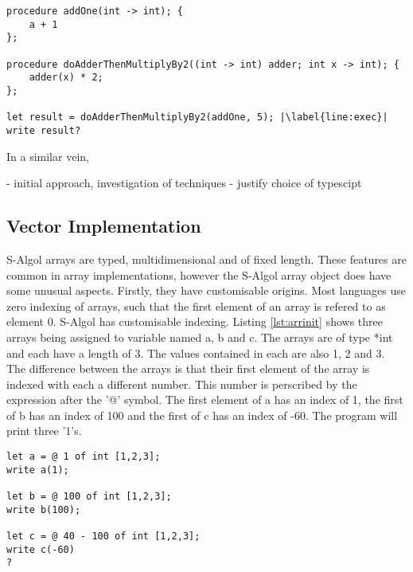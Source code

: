 \documentclass{article}
\begin{document}
\begin{lstlisting}[caption={},label={lst:untypedambiguity}, escapechar="|"]
procedure addOne(int -> int); {
	a + 1
};

procedure doAdderThenMultiplyBy2((int -> int) adder; int x -> int); {
	adder(x) * 2;
};

let result = doAdderThenMultiplyBy2(addOne, 5); |\label{line:exec}|
write result?
\end{lstlisting}

In a similar vein, 





- initial approach, investigation of techniques
- justify choice of typescipt
\subsection{Vector Implementation}

S-Algol arrays are typed, multidimensional and of fixed length. These features are common in array implementations, however the S-Algol array object does have some unusual aspects. Firstly, they have customisable origins. Most languages use zero indexing of arrays, such that the first element of an array is refered to as element 0. S-Algol has customisable indexing. Listing \ref{lst:arrinit} shows three arrays being assigned to variable named a, b and c. The arrays are of type *int and each have a length of 3. The values contained in each are also 1, 2 and 3. The difference between the arrays is that their first element of the array is indexed with each a different number. This number is perscribed by the expression after the '@' symbol. The first element of a has an index of 1, the first of b has an index of 100 and the first of c has an index of -60. The program will print three '1's.

\begin{lstlisting}[caption={Array Initialisation},label={lst:arrinit}, escapechar="|"]
let a = @ 1 of int [1,2,3];
write a(1);

let b = @ 100 of int [1,2,3];
write b(100);

let c = @ 40 - 100 of int [1,2,3];
write c(-60)
?
\end{lstlisting}
\end{document}
